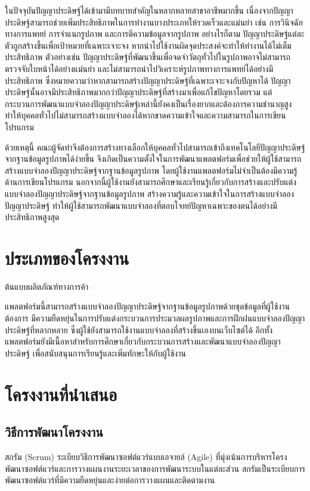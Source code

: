 \documentclass[12pt,oneside,openright,a4paper]{cpe-thai-project}
\begin{document}
\hspace{2em}ในปัจจุบันปัญญาประดิษฐ์ได้เข้ามามีบทบาทสำคัญในหลากหลายสาขาอาชีพมากขึ้น เนื่องจากปัญญาประดิษฐ์สามารถช่วยเพิ่มประสิทธิภาพในการทำงานบางประเภทให้รวดเร็วและแม่นยำ เช่น การวินิจฉัยทางการแพทย์ การจำแนกรูปภาพ และการตีความข้อมูลจากรูปภาพ อย่างไรก็ตาม ปัญญาประดิษฐ์แต่ละตัวถูกสร้างขึ้นเพื่อเป้าหมายที่เฉพาะเจาะจง หากนำไปใช้งานผิดจุดประสงค์จะทำให้ทำงานได้ไม่เต็มประสิทธิภาพ ตัวอย่างเช่น ปัญญาประดิษฐ์ที่พัฒนาขึ้นเพื่อจดจำวัตถุทั่วไปในรูปภาพอาจไม่สามารถตรวจจับใบหน้าได้อย่างแม่นยำ และไม่สามารถนำไปวิเคราะห์รูปภาพทางการแพทย์ได้อย่างมีประสิทธิภาพ ซึ่งหมายความว่าหากสามารถสร้างปัญญาประดิษฐ์ที่เฉพาะเจาะจงกับปัญหาได้ ปัญญาประดิษฐ์นั้นอาจมีประสิทธิภาพมากกว่าปัญญาประดิษฐ์ที่สร้างมาเพื่อแก้ไขปัญหาโดยรวม แต่กระบวนการพัฒนาแบบจำลองปัญญาประดิษฐ์เหล่านี้ยังคงเป็นเรื่องยากและต้องการความชำนาญสูง ทำให้บุคคลทั่วไปไม่สามารถสร้างแบบจำลองได้หากขาดความเข้าใจและความสามารถในการเขียนโปรแกรม 

\hspace{2em}ด้วยเหตุนี้ คณะผู้จัดทำจึงต้องการสร้างทางเลือกให้บุคคลทั่วไปสามารถเข้าถึงเทคโนโลยีปัญญาประดิษฐ์จากฐานข้อมูลรูปภาพได้ง่ายขึ้น จึงเกิดเป็นความตั้งใจในการพัฒนาแพลตฟอร์มเพื่อช่วยให้ผู้ใช้สามารถสร้างแบบจำลองปัญญาประดิษฐ์จากฐานข้อมูลรูปภาพ โดยผู้ใช้งานแพลตฟอร์มไม่จำเป็นต้องมีความรู้ด้านการเขียนโปรแกรม นอกจากนี้ผู้ใช้งานยังสามารถศึกษาและเรียนรู้เกี่ยวกับการสร้างและปรับแต่งแบบจำลองปัญญาประดิษฐ์จากฐานข้อมูลรูปภาพ สร้างความรู้และความเข้าใจในการสร้างแบบจำลองปัญญาประดิษฐ์ ทำให้ผู้ใช้สามารถพัฒนาแบบจำลองที่ตอบโจทย์ปัญหาเฉพาะของตนได้อย่างมีประสิทธิภาพสูงสุด \newline

\section{ประเภทของโครงงาน}
ต้นแบบผลิตภัณฑ์ทางการค้า

\hspace{2em}แพลตฟอร์มนี้สามารถสร้างแบบจำลองปัญญาประดิษฐ์จากฐานข้อมูลรูปภาพด้วยชุดข้อมูลที่ผู้ใช้งานต้องการ มีความยืดหยุ่นในการปรับแต่งกระบวนการประมวลผลรูปภาพและการฝึกฝนแบบจำลองปัญญาประดิษฐ์ที่หลากหลาย ซึ่งผู้ใช้ยังสามารถใช้งานแบบจำลองที่สร้างขึ้นเองบนเว็บไซต์ได้ อีกทั้งแพลตฟอร์มยังมีเนื้อหาสำหรับการศึกษาเกี่ยวกับกระบวนการสร้างและพัฒนาแบบจำลองปัญญาประดิษฐ์ เพื่อสนับสนุนการเรียนรู้และเพิ่มทักษะให้กับผู้ใช้งาน


\section{โครงงานที่นำเสนอ}
\subsection{วิธีการพัฒนาโครงงาน}
สกรัม (Scrum) ระเบียบวิธีการพัฒนาซอฟต์แวร์แบบเอจายล์ (Agile) ที่มุ่งเน้นการบริหารโครงพัฒนาซอฟต์แวร์และการวางแผนงานระยะเวลาของการพัฒนาระบบในแต่ละส่วน สกรัมเป็นระเบียบการพัฒนาซอฟต์แวร์ที่มีความยืดหยุ่นและง่ายต่อการวางแผนและติดตามงาน \cite{scrum}
\end{document}
